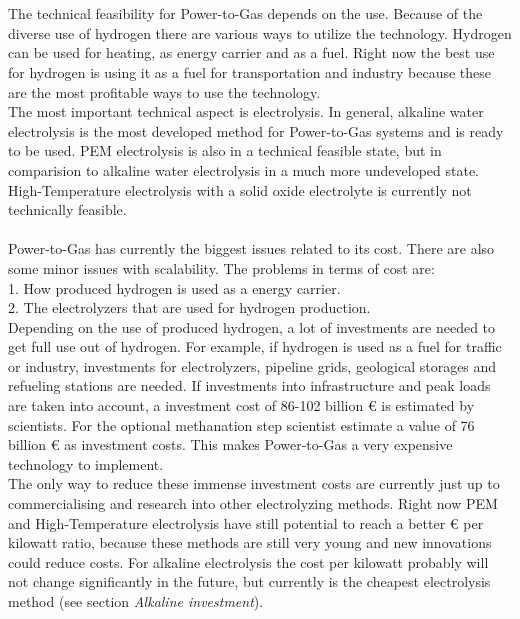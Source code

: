 \documentclass[11pt,a4paper]{article}
\begin{document}
\begin{parcolumns}[colwidths={1=2.5 cm, 2=10 cm, 3=2.5 cm}]{3}
{\\ \\
The technical feasibility for Power-to-Gas depends on the use. Because of the diverse use of hydrogen there are various ways to utilize the technology. Hydrogen can be used for heating, as energy carrier and as a fuel. Right now the best use for hydrogen is using it as a fuel for transportation and industry because these are the most profitable ways to use the technology. \\
The most important technical aspect is electrolysis. In general, alkaline water electrolysis is the most developed method for Power-to-Gas systems and is ready to be used. PEM electrolysis is also in a technical feasible state, but in comparision to alkaline water electrolysis in a much more undeveloped state. High-Temperature electrolysis with a solid oxide electrolyte is currently not technically feasible. 
\\ \\ 
Power-to-Gas has currently the biggest issues related to its cost. There are also some minor issues with scalability. The problems in terms of cost are: \\ 
1. How produced hydrogen is used as a energy carrier. \\
2. The electrolyzers that are used for hydrogen production. \\
Depending on the use of produced hydrogen, a lot of investments are needed to get full use out of hydrogen. For example, if hydrogen is used as a fuel for traffic or industry, investments for electrolyzers, pipeline grids, geological storages and refueling stations are needed.
If investments into infrastructure and peak loads are taken into account, a investment cost of 86-102 billion \euro{ } is estimated by scientists. 
For the optional methanation step scientist estimate a value of 76 billion \euro{ } as investment costs.
This makes Power-to-Gas a very expensive technology to implement.\\
The only way to reduce these immense investment costs are currently just up to commercialising and research into other electrolyzing methods. Right now PEM and High-Temperature electrolysis have still potential to reach a better \euro{ } per kilowatt ratio, because these methods are still very young and new innovations could reduce costs. For alkaline electrolysis the cost per kilowatt probably will not change significantly in the future, but currently is the cheapest electrolysis method (see section \textit{Alkaline investment}).\\
}
\end{parcolumns}
\end{document}
